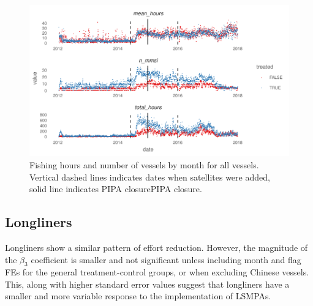 \documentclass[11pt,english]{article}
\begin{document}
\begin{figure}
	\centering
	\includegraphics{Manuscript_files/figure-latex/unnamed-chunk-7-1.pdf}
	\caption{\label{fig:unnamed-chunk-7}\label{fig:all_vessels}Fishing hours and
		number of vessels by month for all vessels. Vertical dashed lines
		indicates dates when satellites were added, solid line indicates PIPA
		closurePIPA closure.}
\end{figure}

\clearpage

\hypertarget{longliners}{%
\subsection{Longliners}\label{longliners}}

Longliners show a similar pattern of effort reduction. However, the
magnitude of the \(\beta_3\) coefficient is smaller  and not significant unless
including month and flag FEs for the general treatment-control groups,
or when excluding Chinese vessels. This, along with higher standard
error values suggest that longliners have a smaller and more variable
response to the implementation of LSMPAs.
\end{document}
